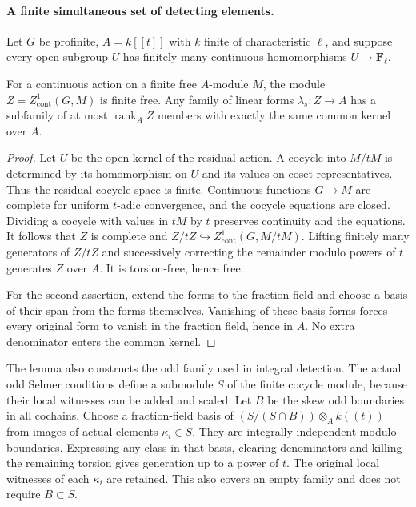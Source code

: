 \paragraph{A finite simultaneous set of detecting elements.}
Let $G$ be profinite, $A=k[[t]]$ with $k$ finite of characteristic
$\ell$, and suppose every open subgroup $U$ has finitely many
continuous homomorphisms $U\to\mathbf F_\ell$.

\begin{lemma}
\label{lem:selmer-finite-selection}
For a continuous action on a finite free $A$-module $M$, the module
$Z=Z^1_{\mathrm{cont}}(G,M)$ is finite free. Any family of linear forms
$\lambda_s:Z\to A$ has a subfamily of at most $\operatorname{rank}_A Z$
members with exactly the same common kernel over $A$.
\end{lemma}

\begin{proof}
Let $U$ be the open kernel of the residual action. A cocycle into
$M/tM$ is determined by its homomorphism on $U$ and its values on
coset representatives. Thus the residual cocycle space is finite.
Continuous functions $G\to M$ are complete for uniform $t$-adic
convergence, and the cocycle equations are closed. Dividing a cocycle
with values in $tM$ by $t$ preserves continuity and the equations.
It follows that $Z$ is complete and
$Z/tZ\hookrightarrow Z^1_{\mathrm{cont}}(G,M/tM)$.
Lifting finitely many generators of $Z/tZ$ and successively correcting
the remainder modulo powers of $t$ generates $Z$ over $A$.
It is torsion-free, hence free.

For the second assertion, extend the forms to the fraction field and
choose a basis of their span from the forms themselves. Vanishing of
these basis forms forces every original form to vanish in the fraction
field, hence in $A$. No extra denominator enters the common kernel.
\end{proof}

The lemma also constructs the odd family used in integral detection.
The actual odd Selmer conditions define a submodule $S$ of the finite
cocycle module, because their local witnesses can be added and scaled.
Let $B$ be the skew odd boundaries in all cochains. Choose a
fraction-field basis of $(S/(S\cap B))\otimes_A k((t))$ from images of
actual elements $\kappa_i\in S$. They are integrally independent
modulo boundaries. Expressing any class in that basis, clearing
denominators and killing the remaining torsion gives generation up to
a power of $t$. The original local witnesses of each $\kappa_i$ are
retained. This also covers an empty family and does not require
$B\subset S$.

